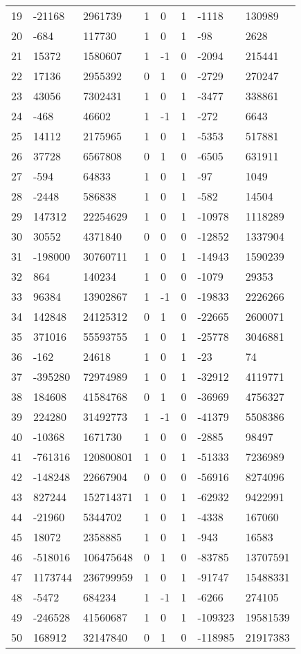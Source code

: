 \documentclass{amsart}
\begin{document}
\begin{longtable}{|l|l|l|lllll|}
19&-21168&2961739&1&0&1&-1118&130989\\
20&-684&117730&1&0&1&-98&2628\\
21&15372&1580607&1&-1&0&-2094&215441\\
22&17136&2955392&0&1&0&-2729&270247\\
23&43056&7302431&1&0&1&-3477&338861\\
24&-468&46602&1&-1&1&-272&6643\\
25&14112&2175965&1&0&1&-5353&517881\\
26&37728&6567808&0&1&0&-6505&631911\\
27&-594&64833&1&0&1&-97&1049\\
28&-2448&586838&1&0&1&-582&14504\\
29&147312&22254629&1&0&1&-10978&1118289\\
30&30552&4371840&0&0&0&-12852&1337904\\
31&-198000&30760711&1&0&1&-14943&1590239\\
32&864&140234&1&0&0&-1079&29353\\
33&96384&13902867&1&-1&0&-19833&2226266\\
34&142848&24125312&0&1&0&-22665&2600071\\
35&371016&55593755&1&0&1&-25778&3046881\\
36&-162&24618&1&0&1&-23&74\\
37&-395280&72974989&1&0&1&-32912&4119771\\
38&184608&41584768&0&1&0&-36969&4756327\\
39&224280&31492773&1&-1&0&-41379&5508386\\
40&-10368&1671730&1&0&0&-2885&98497\\
41&-761316&120800801&1&0&1&-51333&7236989\\
42&-148248&22667904&0&0&0&-56916&8274096\\
43&827244&152714371&1&0&1&-62932&9422991\\
44&-21960&5344702&1&0&1&-4338&167060\\
45&18072&2358885&1&0&1&-943&16583\\
46&-518016&106475648&0&1&0&-83785&13707591\\
47&1173744&236799959&1&0&1&-91747&15488331\\
48&-5472&684234&1&-1&1&-6266&274105\\
49&-246528&41560687&1&0&1&-109323&19581539\\
50&168912&32147840&0&1&0&-118985&21917383\\
\hline
\end{longtable}
\end{document}
